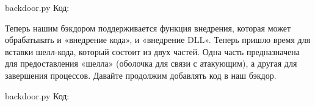 \documentclass[12pt, a4paper, oneside]{book}
\begin{document}
backdoor.py
Код:




    


Теперь нашим бэкдором поддерживается функция внедрения, которая может обрабатывать и «внедрение кода», и «внедрение DLL». Теперь пришло время для вставки шелл-кода, который состоит из двух частей. Одна часть предназначена для предоставления «шелла» (оболочка для связи с атакующим), а другая для завершения процессов. Давайте продолжим добавлять код в наш бэкдор.

backdoor.py
Код:

\end{document}
